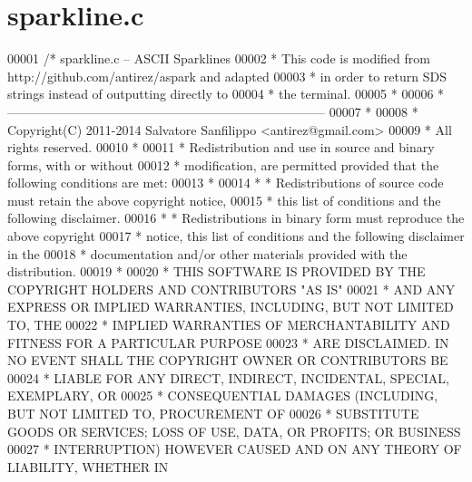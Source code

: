 \hypertarget{sparkline_8c_source}{}\section{sparkline.\+c}
\label{sparkline_8c_source}

\begin{DoxyCode}
00001 \textcolor{comment}{/* sparkline.c -- ASCII Sparklines}
00002 \textcolor{comment}{ * This code is modified from http://github.com/antirez/aspark and adapted}
00003 \textcolor{comment}{ * in order to return SDS strings instead of outputting directly to}
00004 \textcolor{comment}{ * the terminal.}
00005 \textcolor{comment}{ *}
00006 \textcolor{comment}{ * ---------------------------------------------------------------------------}
00007 \textcolor{comment}{ *}
00008 \textcolor{comment}{ * Copyright(C) 2011-2014 Salvatore Sanfilippo <antirez@gmail.com>}
00009 \textcolor{comment}{ * All rights reserved.}
00010 \textcolor{comment}{ *}
00011 \textcolor{comment}{ * Redistribution and use in source and binary forms, with or without}
00012 \textcolor{comment}{ * modification, are permitted provided that the following conditions are met:}
00013 \textcolor{comment}{ *}
00014 \textcolor{comment}{ *   * Redistributions of source code must retain the above copyright notice,}
00015 \textcolor{comment}{ *     this list of conditions and the following disclaimer.}
00016 \textcolor{comment}{ *   * Redistributions in binary form must reproduce the above copyright}
00017 \textcolor{comment}{ *     notice, this list of conditions and the following disclaimer in the}
00018 \textcolor{comment}{ *     documentation and/or other materials provided with the distribution.}
00019 \textcolor{comment}{ *}
00020 \textcolor{comment}{ * THIS SOFTWARE IS PROVIDED BY THE COPYRIGHT HOLDERS AND CONTRIBUTORS "AS IS"}
00021 \textcolor{comment}{ * AND ANY EXPRESS OR IMPLIED WARRANTIES, INCLUDING, BUT NOT LIMITED TO, THE}
00022 \textcolor{comment}{ * IMPLIED WARRANTIES OF MERCHANTABILITY AND FITNESS FOR A PARTICULAR PURPOSE}
00023 \textcolor{comment}{ * ARE DISCLAIMED. IN NO EVENT SHALL THE COPYRIGHT OWNER OR CONTRIBUTORS BE}
00024 \textcolor{comment}{ * LIABLE FOR ANY DIRECT, INDIRECT, INCIDENTAL, SPECIAL, EXEMPLARY, OR}
00025 \textcolor{comment}{ * CONSEQUENTIAL DAMAGES (INCLUDING, BUT NOT LIMITED TO, PROCUREMENT OF}
00026 \textcolor{comment}{ * SUBSTITUTE GOODS OR SERVICES; LOSS OF USE, DATA, OR PROFITS; OR BUSINESS}
00027 \textcolor{comment}{ * INTERRUPTION) HOWEVER CAUSED AND ON ANY THEORY OF LIABILITY, WHETHER IN}

\end{DoxyCode}
